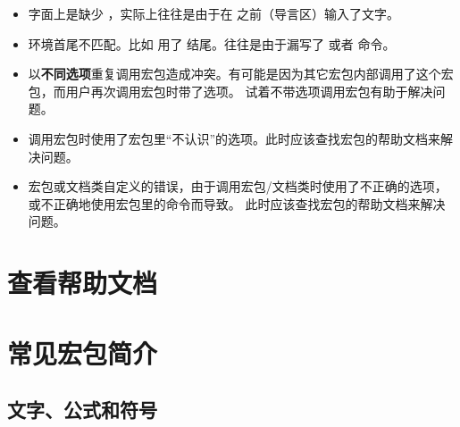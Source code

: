 \begin{itemize}
\item {}

字面上是缺少 ，实际上往往是由于在  之前（导言区）输入了文字。

\item {}

环境首尾不匹配。比如  用了  结尾。往往是由于漏写了 
或者  命令。

\item {}

以\textbf{不同选项}重复调用宏包造成冲突。有可能是因为其它宏包内部调用了这个宏包，而用户再次调用宏包时带了选项。
试着不带选项调用宏包有助于解决问题。

\item {}

调用宏包时使用了宏包里“不认识”的选项。此时应该查找宏包的帮助文档来解决问题。

\item {}

宏包或文档类自定义的错误，由于调用宏包/文档类时使用了不正确的选项，或不正确地使用宏包里的命令而导致。
此时应该查找宏包的帮助文档来解决问题。

\end{itemize}

\section{查看帮助文档}\label{sec:texdoc}

\leavevmode\nobreakspace

\section{常见宏包简介}\label{sec:pkg-list}

\def\pkglabel#1{\makebox[60pt][l]{\pkg{#1}}}

\subsection{文字、公式和符号}\label{subsec:text-math-symbols}

